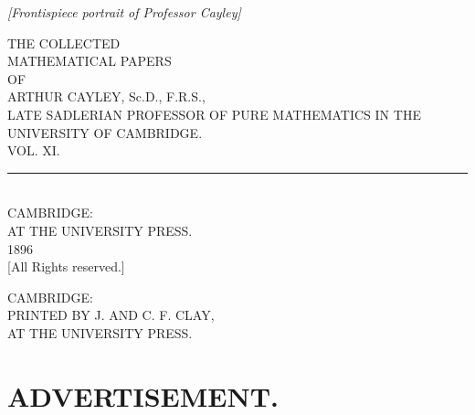 \documentclass[11pt,a4paper]{book}
\begin{document}
\thispagestyle{empty}
\vspace*{\fill}
\begin{center}
\textit{[Frontispiece portrait of Professor Cayley]}
\end{center}
\vspace*{\fill}
\cleardoublepage

\thispagestyle{empty}
\begin{center}
\vspace*{2em}
{\large THE COLLECTED}\\[1em]
{\LARGE MATHEMATICAL PAPERS}\\[2em]
{\large OF}\\[2em]
{\Large ARTHUR CAYLEY, Sc.D., F.R.S.,}\\[0.5em]
{\footnotesize LATE SADLERIAN PROFESSOR OF PURE MATHEMATICS IN THE UNIVERSITY OF CAMBRIDGE.}\\[4em]
{\Large VOL. XI.}\\[5em]
\rule{0.3\textwidth}{0.4pt}\\[1em]
CAMBRIDGE:\\
AT THE UNIVERSITY PRESS.\\
1896\\[0.5em]
{\small [All Rights reserved.]}
\end{center}
\cleardoublepage

\thispagestyle{empty}
\begin{center}
\vspace*{\fill}
{\small CAMBRIDGE:\\
PRINTED BY J. AND C. F. CLAY,\\
AT THE UNIVERSITY PRESS.}
\vspace*{\fill}
\end{center}
\cleardoublepage

\chapter*{ADVERTISEMENT.}
\end{document}
